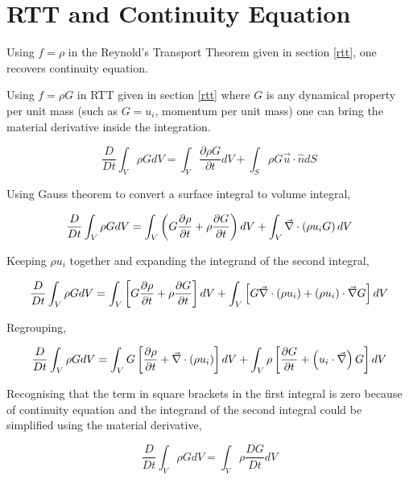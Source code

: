 \section{RTT and Continuity Equation}
\label{ktt}

Using $f=\rho$ in the Reynold's Transport Theorem given in section \ref{rtt}, one recovers continuity equation.

Using $f=\rho G$ in RTT given in section \ref{rtt} where $G$ is any dynamical property per unit mass (such as $G = u_i$, momentum per unit mass) one can bring the material derivative inside the integration.

$$ \frac{D}{Dt} \int_{V}{\rho G dV} = \int_{V}{\frac{\partial \rho G}{\partial t} dV} + \int_{S}{\rho G \vec{u} \cdot \hat{n} dS} $$

Using Gauss theorem to convert a surface integral to volume integral,

$$ \frac{D}{Dt} \int_{V}{\rho G dV} = 
\int_{V}{\left( G \frac{\partial \rho}{\partial t} + \rho \frac{\partial G}{\partial t} \right) dV} + 
\int_{V}{\vec{\nabla} \cdot \left( \rho u_i G \right) dV} $$

Keeping $\rho u_i$ together and expanding the integrand of the second integral,

$$ \frac{D}{Dt} \int_{V}{\rho G dV} = 
\int_{V}{\left[ G \frac{\partial \rho}{\partial t} + \rho \frac{\partial G}{\partial t} \right] dV} + 
\int_{V}{\left[ G \vec{\nabla} \cdot \left(\rho u_i\right) + \left(\rho u_i\right) \cdot \vec{\nabla} G \right] dV} $$

Regrouping,

$$ \frac{D}{Dt} \int_{V}{\rho G dV} = 
\int_{V}{G \left[ \frac{\partial \rho}{\partial t} + \vec{\nabla} \cdot \left(\rho u_i\right) \right]  dV} + 
\int_{V}{\rho \left[ \frac{\partial G}{\partial t}  + \left(u_i \cdot \vec{\nabla}\right) G \right] dV} $$

Recognising that the term in square brackets in the first integral is zero because of continuity equation and the integrand of the second integral could be simplified using the material derivative,

$$ \boxed{ \frac{D}{Dt} \int_{V}{\rho G dV} = 
\int_{V}{\rho \frac{DG}{Dt} dV} }$$


